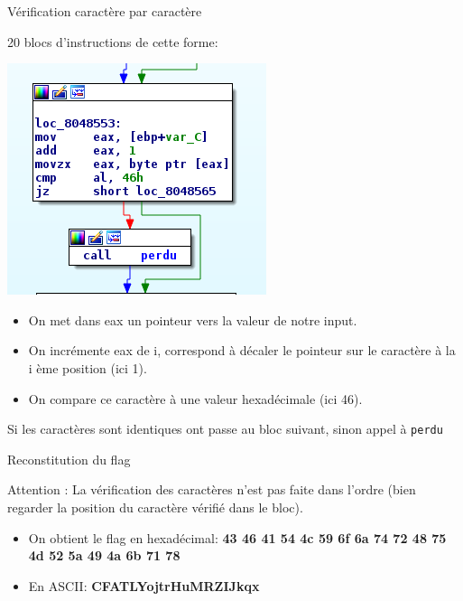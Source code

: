 \documentclass[10pt,sans,usenames,dvipsnames,french,compress]{beamer}
\begin{document}
\begin{frame}[fragile]{Vérification caractère par caractère}
	\begin{block}{}
		20 blocs d'instructions de cette forme:    
 		
 		\begin{center}
			\includegraphics[height=0.2\linewidth]{114/cmpcara.png}
		\end{center}
	\end{block}

	\begin{block}{}
		\begin{itemize}
			\item On met dans eax un pointeur vers la valeur de notre input.
			\item On incrémente eax de i, correspond à décaler le pointeur sur le caractère à la i ème position (ici 1).
			\item On compare ce caractère à une valeur hexadécimale (ici 46).
		\end{itemize}
	\end{block}

	\begin{block}{}
		Si les caractères sont identiques ont passe au bloc suivant, sinon appel à \texttt{perdu}
	\end{block}
\end{frame}
		
\begin{frame}[fragile]{Reconstitution du flag}
	\begin{block}{Attention :}
		La vérification des caractères n'est pas faite dans l'ordre (bien regarder la position du caractère vérifié dans le bloc).
	\end{block}

	\begin{exampleblock}{}
		\begin{itemize}
			\item On obtient le flag en hexadécimal: \textbf{43 46 41 54 4c 59 6f 6a 74 72 48 75 4d 52 5a 49 4a 6b 71 78}
			\item En ASCII: \textbf{CFATLYojtrHuMRZIJkqx}
		\end{itemize}
	\end{exampleblock}
\end{frame}
\end{document}

